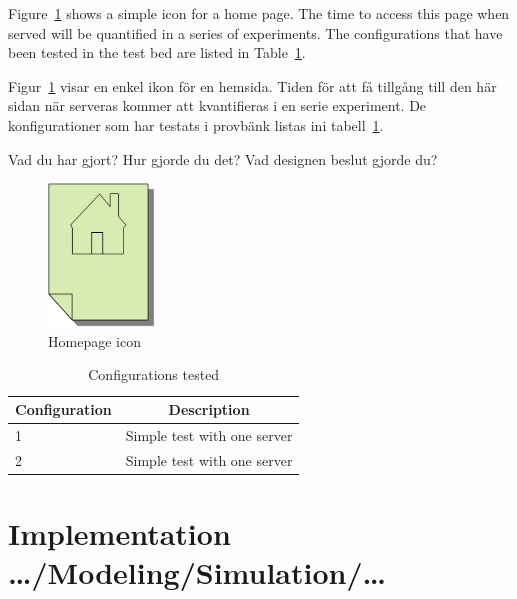 \documentclass[english]{kththesis}
\newenvironment{swedishnotes}%
  {\begin{center}
      \selectlanguage{swedish}
      \color{blue}}%
    {\end{center}\selectlanguage{english}
    }
\begin{document}
Figure~\ref{fig:homepageicon} shows a simple icon for a home page. The time
to access this page when served will be quantified in a series of
experiments. The configurations that have been tested in the test bed are
listed in Table~\ref{tab:configstested}.

\begin{swedishnotes}
Figur~\ref{fig:homepageicon}  visar en enkel ikon för en hemsida. Tiden för att få tillgång till den här sidan när serveras kommer att kvantifieras i en serie experiment. De konfigurationer som har testats i provbänk listas ini tabell~\ref{tab:configstested}.

Vad du har gjort? Hur gjorde du det? Vad designen beslut gjorde du?
\end{swedishnotes}
 
\begin{figure}[!ht]
  \begin{center}
    \includegraphics[width=0.25\textwidth]{Homepage-icon.png}
  \end{center}
  \caption{Homepage icon}
  \label{fig:homepageicon}
\end{figure}

\begin{table}[!ht]
  \begin{center}
    \caption{Configurations tested}
    \label{tab:configstested}
    \begin{tabular}{l|c} %
      \textbf{Configuration} & \textbf{Description} \\
      \hline
      1 & Simple test with one server\\
      2 & Simple test with one server\\
    \end{tabular}
  \end{center}
\end{table}

\section{Implementation …/Modeling/Simulation/…}
\label{sec:implementationDetails}
\end{document}
